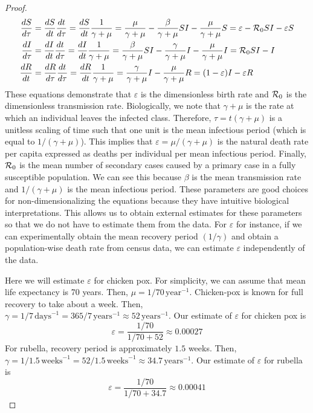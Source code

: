 \documentclass[12pt]{article}\usepackage[]{graphicx}\usepackage[]{color}
\begin{document}
\begin{enumerate}[(a)]
{\begin{proof}
{\begin{equation}
\begin{aligned}
\frac{dS}{d\tau} &= \frac{dS}{dt} \frac{dt}{d\tau} = \frac{dS}{dt} \frac{1}{\gamma + \mu} = \frac{\mu}{\gamma + \mu} - \frac{\beta}{\gamma + \mu} SI - \frac{\mu}{\gamma + \mu} S = \varepsilon - {\cal R}_0 SI - \varepsilon S\\
\frac{dI}{d\tau} &= \frac{dI}{dt} \frac{dt}{d\tau} = \frac{dI}{dt} \frac{1}{\gamma + \mu} = \frac{\beta}{\gamma + \mu} SI - \frac{\gamma}{\gamma + \mu} I - \frac{\mu}{\gamma + \mu}I = {\cal R}_0 SI - I\\
\frac{dR}{dt} &= \frac{dR}{d\tau} \frac{dt}{d\tau} = \frac{dR}{dt} \frac{1}{\gamma + \mu} = \frac{\gamma}{\gamma + \mu} I - \frac{\mu}{\gamma + \mu} R = (1-\varepsilon) I - \varepsilon R 
\end{aligned}
\end{equation}
These equations demonstrate that $\varepsilon$ is the dimensionless birth rate and ${\cal R}_0$ is the dimensionless transmission rate. Biologically, we note that $\gamma + \mu$ is the rate at which an individual leaves the infected class. Therefore, $\tau = t(\gamma + \mu)$ is a unitless scaling of time such that one unit is the mean infectious period (which is equal to $1/(\gamma + \mu)$). This implies that $\varepsilon = \mu/(\gamma + \mu)$ is the natural death rate per capita expressed as deaths per individual per mean infectious period. Finally, ${\cal R}_0$ is the mean number of secondary cases caused by a primary case in a fully susceptible population. We can see this because $\beta$ is the mean transmission rate and $1/(\gamma + \mu)$ is the mean infectious period. These parameters are good choices for non-dimensionalizing the equations because they have intuitive biological interpretations. This allows us to obtain external estimates for these parameters so that we do not have to estimate them from the data. For $\varepsilon$ for instance, if we can experimentally obtain the mean recovery period $(1/\gamma)$ and obtain a population-wise death rate from census data, we can estimate $\varepsilon$ independently of the data. 

Here we will estimate $\varepsilon$ for chicken pox. For simplicity, we can assume that mean life expectancy is 70 years. Then, $\mu=1/70 \, \textrm{year}^{-1}$.
Chicken-pox is known for full recovery to take about a week. 
Then, $\gamma = 1/7 \, \textrm{days}^{-1} = 365/7 \, \textrm{years}^{-1} \approx 52 \, \textrm{years}^{-1}$. 
Our estimate of $\varepsilon$ for chicken pox is
$$
\varepsilon = \frac{1/70}{1/70 + 52} \approx 0.00027
$$
For rubella, recovery period is approximately $1.5$ weeks. 
Then, $\gamma = 1/1.5 \, \textrm{weeks}^{-1} = 52/1.5 \, \textrm{weeks}^{-1} \approx 34.7 \, \textrm{years}^{-1}$.
Our estimate of $\varepsilon$ for rubella is
$$
\varepsilon = \frac{1/70}{1/70 + 34.7} \approx 0.00041
$$
}\end{proof}}


\end{enumerate}
\end{document}
